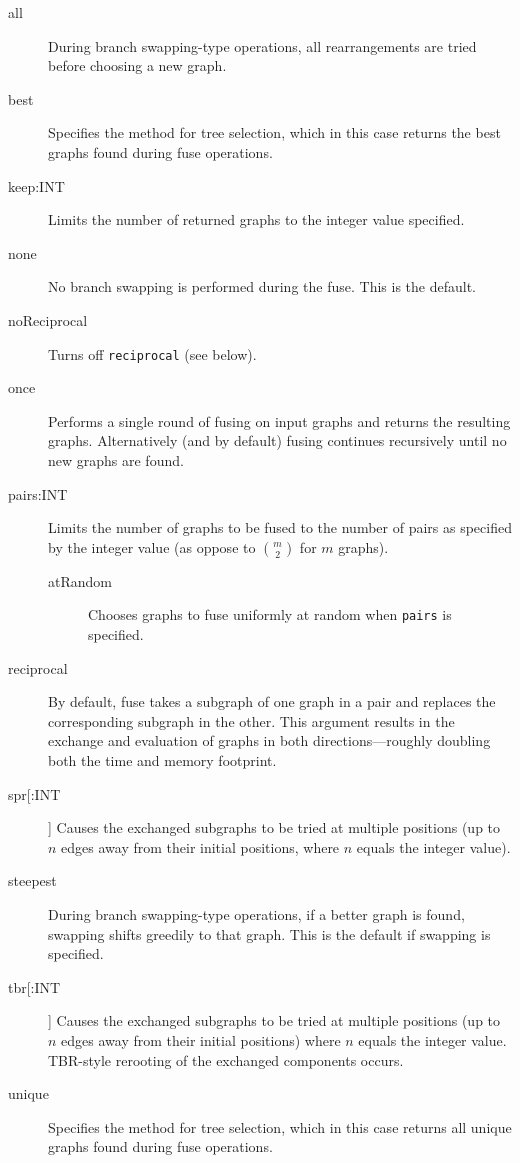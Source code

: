 	\begin{description}
		\item [all]  During branch swapping-type operations, all rearrangements are tried before 
		choosing a new graph. 
		
		\item [best] Specifies the method for tree selection, which in this case returns the best graphs 
		found during fuse operations.		
		
		\item [keep:INT] Limits the number of returned graphs to the integer value specified. 
		
		\item [none] No branch swapping is performed during the fuse. This is the default.
		
		\item [noReciprocal] Turns off \texttt{reciprocal} (see below).
		
		\item [once] Performs a single round of fusing on input graphs and returns the resulting graphs. 
		Alternatively (and by default) fusing continues recursively until no new graphs are found.
		
		\item [pairs:INT] Limits the number of graphs to be fused to the number of pairs as 
		specified by the integer value (as oppose to $\binom{m}{2}$ for $m$ graphs).
		
			\begin{description}
			\item [atRandom] Chooses graphs to fuse uniformly at random when \texttt{pairs} is 
			specified. 
			\end{description}
		
		\item [reciprocal] By default, fuse takes a subgraph of one graph in a pair and replaces the 
		corresponding subgraph in the other.  This argument results in the exchange and evaluation 
		of graphs in both directions---roughly doubling both the time and memory footprint.
		
		\item [spr[:INT]] Causes the exchanged subgraphs to be tried at multiple positions (up to 
		$n$ edges away from their initial positions, where $n$ equals the integer value).
		
		\item [steepest] During branch swapping-type operations, if a better graph is found, swapping 
		shifts greedily to that graph. This is the default if swapping is specified.
		
		\item [tbr[:INT]] Causes the exchanged subgraphs to be tried at multiple positions (up to 
		$n$ edges away from their initial positions) where $n$ equals the integer value. TBR-style 
		rerooting of the exchanged components occurs.
		
		\item [unique] Specifies the method for tree selection, which in this case returns all unique 
		graphs found during fuse operations.	
	\end{description}	
	
